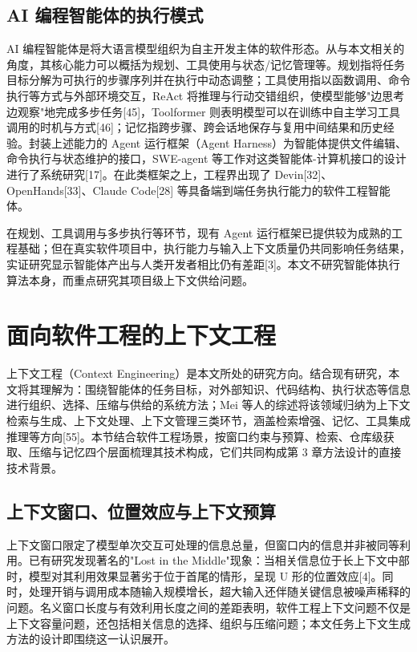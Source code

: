 \subsection{AI 编程智能体的执行模式}
AI 编程智能体是将大语言模型组织为自主开发主体的软件形态。从与本文相关的角度，其核心能力可以概括为规划、工具使用与状态/记忆管理等。规划指将任务目标分解为可执行的步骤序列并在执行中动态调整；工具使用指以函数调用、命令执行等方式与外部环境交互，ReAct 将推理与行动交错组织，使模型能够"边思考边观察"地完成多步任务[45]，Toolformer 则表明模型可以在训练中自主学习工具调用的时机与方式[46]；记忆指跨步骤、跨会话地保存与复用中间结果和历史经验。封装上述能力的 Agent 运行框架（Agent Harness）为智能体提供文件编辑、命令执行与状态维护的接口，SWE-agent 等工作对这类智能体-计算机接口的设计进行了系统研究[17]。在此类框架之上，工程界出现了 Devin[32]、OpenHands[33]、Claude Code[28] 等具备端到端任务执行能力的软件工程智能体。

在规划、工具调用与多步执行等环节，现有 Agent 运行框架已提供较为成熟的工程基础；但在真实软件项目中，执行能力与输入上下文质量仍共同影响任务结果，实证研究显示智能体产出与人类开发者相比仍有差距[3]。本文不研究智能体执行算法本身，而重点研究其项目级上下文供给问题。


\section{面向软件工程的上下文工程}
上下文工程（Context Engineering）是本文所处的研究方向。结合现有研究，本文将其理解为：围绕智能体的任务目标，对外部知识、代码结构、执行状态等信息进行组织、选择、压缩与供给的系统方法；Mei 等人的综述将该领域归纳为上下文检索与生成、上下文处理、上下文管理三类环节，涵盖检索增强、记忆、工具集成推理等方向[55]。本节结合软件工程场景，按窗口约束与预算、检索、仓库级获取、压缩与记忆四个层面梳理其技术构成，它们共同构成第 3 章方法设计的直接技术背景。


\subsection{上下文窗口、位置效应与上下文预算}
上下文窗口限定了模型单次交互可处理的信息总量，但窗口内的信息并非被同等利用。已有研究发现著名的"Lost in the Middle"现象：当相关信息位于长上下文中部时，模型对其利用效果显著劣于位于首尾的情形，呈现 U 形的位置效应[4]。同时，处理开销与调用成本随输入规模增长，超大输入还伴随关键信息被噪声稀释的问题。名义窗口长度与有效利用长度之间的差距表明，软件工程上下文问题不仅是上下文容量问题，还包括相关信息的选择、组织与压缩问题；本文任务上下文生成方法的设计即围绕这一认识展开。

